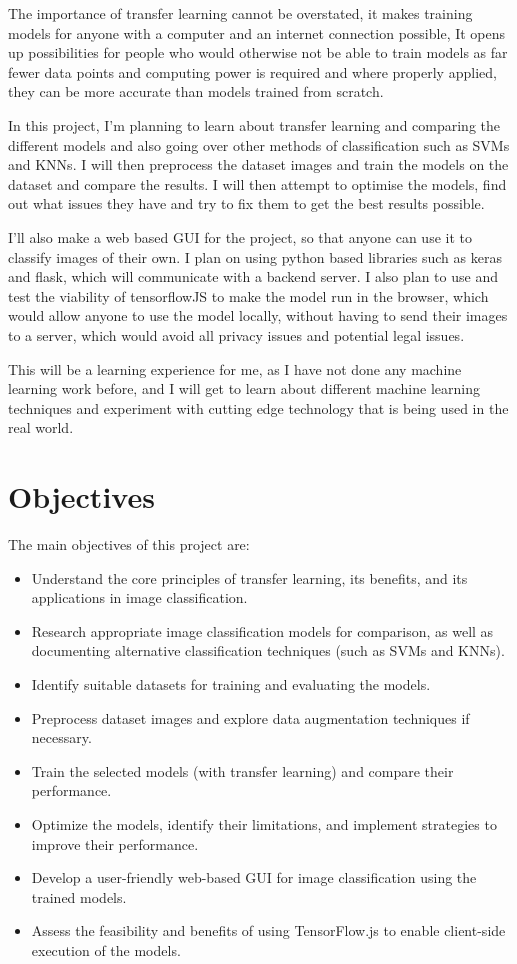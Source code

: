 \documentclass[]{final_report}
\begin{document}
The importance of transfer learning cannot be overstated, it makes training models for anyone with a computer and an internet connection possible, It opens up possibilities for people who would otherwise not be able to train models as far fewer data points and computing power is required and where properly applied, they can be more accurate than models trained from scratch.

In this project, I'm planning to learn about transfer learning and comparing the different models and also going over other methods of classification such as SVMs and KNNs. I will then preprocess the dataset images and train the models on the dataset and compare the results. I will then attempt to optimise the models, find out what issues they have and try to fix them to get the best results possible.

I'll also make a web based GUI for the project, so that anyone can use it to classify images of their own. I plan on using python based libraries such as keras and flask, which will communicate with a backend server. I also plan to use and test the viability of tensorflowJS\cite{smilkov2019tensorflowjs} to make the model run in the browser, which would allow anyone to use the model locally, without having to send their images to a server, which would avoid all privacy issues and potential legal issues.

This will be a learning experience for me, as I have not done any machine learning work before, and I will get to learn about different machine learning techniques and experiment with cutting edge technology that is being used in the real world.



\section{Objectives}


The main objectives of this project are:

\begin{itemize}
  \item Understand the core principles of transfer learning, its benefits, and its applications in image classification.
  \item Research appropriate image classification models for comparison, as well as documenting alternative classification techniques (such as SVMs and KNNs).
  \item Identify suitable datasets for training and evaluating the models.
  \item Preprocess dataset images and explore data augmentation techniques if necessary.
  \item Train the selected models (with transfer learning) and compare their performance.
  \item Optimize the models, identify their limitations, and implement strategies to improve their performance.
  \item Develop a user-friendly web-based GUI for image classification using the trained models.
  \item Assess the feasibility and benefits of using TensorFlow.js to enable client-side execution of the models.
\end{itemize}
\end{document}
